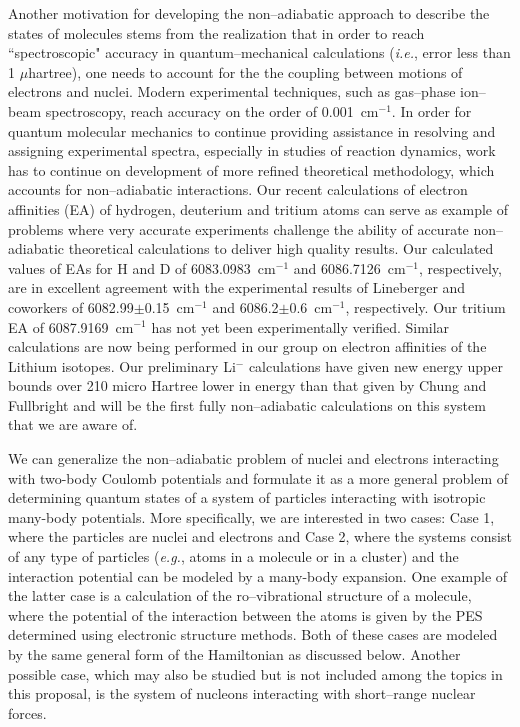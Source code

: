 Another motivation for developing the non--adiabatic approach to 
describe the states of molecules stems from the realization that
in order to reach ``spectroscopic" accuracy in quantum--mechanical
calculations ({\it i.e.}, error less than 1 $\mu$hartree), one needs
to account for the the coupling between
motions of electrons and nuclei. Modern experimental techniques,
such as gas--phase ion--beam spectroscopy, reach accuracy on the
order of 0.001~cm$^{-1}$. \cite{C} In order for quantum molecular mechanics
to continue providing assistance in resolving and assigning
experimental spectra, especially in studies of reaction dynamics,
work has to continue on development of more refined theoretical 
methodology, which accounts for non--adiabatic interactions.
Our recent calculations of electron affinities (EA) of hydrogen, deuterium
and tritium atoms \cite{A37} can serve as example of 
problems where very accurate experiments challenge the ability
of accurate non--adiabatic theoretical calculations 
to deliver high quality results.
Our calculated values of EAs for H and D of 6083.0983~cm$^{-1}$
and 6086.7126~cm$^{-1}$, respectively, are in excellent
agreement with the experimental results of Lineberger and
coworkers of 6082.99$\pm$0.15~cm$^{-1}$ and 6086.2$\pm$0.6~cm$^{-1}$,
respectively. Our tritium EA of 6087.9169~cm$^{-1}$ has not yet 
been experimentally verified. Similar calculations are now being
performed in our group 
on electron affinities of the Lithium isotopes.
Our preliminary Li$^-$ calculations have given new energy upper bounds
over 210 micro Hartree lower in energy than that
given by Chung and Fullbright \cite{Chung92} and will be the 
first fully non--adiabatic calculations on this system that we
are aware of.

We can generalize the non--adiabatic problem of nuclei and electrons
interacting with two-body Coulomb potentials
and formulate it as a more general problem of determining  
quantum states
of a system of particles interacting with 
isotropic many-body potentials. More
specifically, we are interested in two cases: 
Case 1, where the
particles are nuclei and electrons 
and
Case 2, where the systems consist of any type of particles
({\it e.g.}, atoms in a molecule or in a cluster)
and the interaction potential can be modeled by a
many-body expansion.
One example of the latter case is a calculation of the ro--vibrational
structure of a molecule, where the potential 
of the interaction between the atoms
is given by the PES determined using electronic structure
methods.
Both of these cases are modeled by the same general form of
the Hamiltonian as discussed below.
Another possible case, which may also be studied but is 
not included among the topics in this proposal, is the system
of nucleons interacting with short--range nuclear forces.

